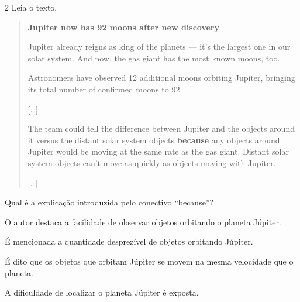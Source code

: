 \num{2} Leia o texto.

\begin{quote}
\textbf{Jupiter now has 92 moons after new discovery}

Jupiter already reigns as king of the planets --- it's the largest one
in our solar system. And now, the gas giant has the most known moons,
too.

Astronomers have observed 12 additional moons orbiting Jupiter, bringing
its total number of confirmed moons to 92.

{[}\ldots{}{]}

The team could tell the difference between Jupiter and the objects
around it versus the distant solar system objects \textbf{because} any
objects around Jupiter would be moving at the same rate as the gas
giant. Distant solar system objects can't move as quickly as objects
moving with Jupiter.

{[}\ldots{}{]}

\end{quote}

Qual é a explicação introduzida pelo conectivo ``because''?

\begin{escolha}
\item O autor destaca a facilidade de observar objetos orbitando o planeta
Júpiter.

\item É mencionada a quantidade desprezível de objetos orbitando Júpiter.

\item É dito que os objetos que orbitam Júpiter se movem na mesma
velocidade que o planeta.

\item A dificuldade de localizar o planeta Júpiter é exposta.
\end{escolha}


